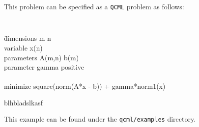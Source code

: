 \documentclass[11pt]{article}
\def\qcml{\texttt{QCML}\xspace}
\begin{document}
This problem can be specified as a \qcml problem as follows:
{\tt
\begin{tabbing}
\qquad 
\= dimensions m n \\
\> variable x(n) \\
\> parameters A(m,n) b(m)\\ 
\> parameter gamma positive\\
\\
\> minimize square(norm(A*x - b)) + gamma*norm1(x)
\end{tabbing}
}
\noindent blhbladslkasf

This example can be found under the {\tt qcml/examples} directory.

% 
% 
% 
% 
% 
% 
% 
% 
\end{document}
